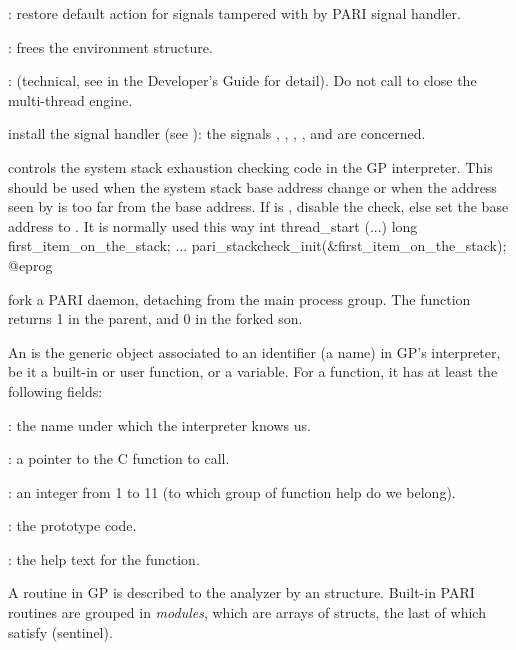   : restore  default action for signals
tampered with by PARI signal handler.

  : frees the  environment structure.

  : (technical, see  in the Developer's
Guide for detail). Do not call  to close the multi-thread
engine.

 install the signal handler 
(see ): the signals , , ,
,  and  are concerned.

 controls the system stack
exhaustion checking code in the GP interpreter. This should be used when the
system stack base address change or when the address seen by 
is too far from the base address. If  is , disable the
check, else set the base address to . It is normally used this
way
\bprog
int thread_start (...)
{
  long first_item_on_the_stack;
  ...
  pari_stackcheck_init(&first_item_on_the_stack);
}
@eprog

 fork a PARI daemon, detaching from the main
process group. The function returns 1 in the parent, and 0 in the
forked son.


An  is the generic object associated to an identifier (a name)
in GP's interpreter, be it a built-in or user function, or a variable. For
a function, it has at least the following fields:

  : the name under which the interpreter knows us.

  :  a pointer to the C function to call.

  : an integer from 1 to 11 (to which group of function
                    help do we belong).

  : the prototype code.

  : the help text for the function.

A routine in GP is described to the analyzer by an 
structure. Built-in PARI routines are grouped in \emph{modules}, which
are arrays of  structs, the last of which satisfy
 (sentinel).

